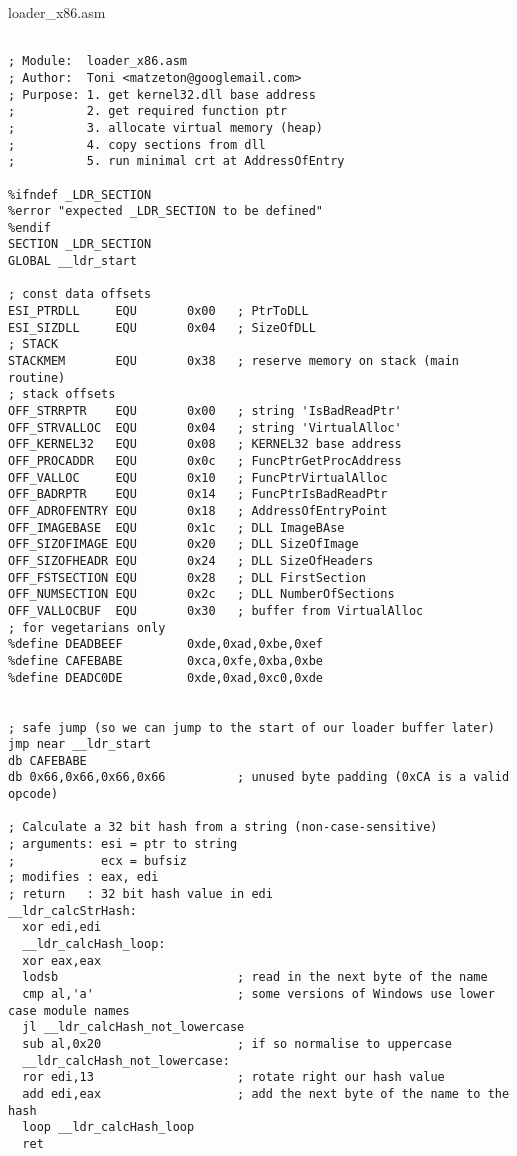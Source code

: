 \documentclass{article}
\begin{document}
\newpage
loader\_x86.asm
\begin{lstlisting}[frame=single]  % Start your code-block

; Module:  loader_x86.asm
; Author:  Toni <matzeton@googlemail.com>
; Purpose: 1. get kernel32.dll base address
;          2. get required function ptr
;          3. allocate virtual memory (heap)
;          4. copy sections from dll
;          5. run minimal crt at AddressOfEntry

%ifndef _LDR_SECTION
%error "expected _LDR_SECTION to be defined"
%endif
SECTION _LDR_SECTION
GLOBAL __ldr_start

; const data offsets
ESI_PTRDLL     EQU       0x00   ; PtrToDLL
ESI_SIZDLL     EQU       0x04   ; SizeOfDLL
; STACK
STACKMEM       EQU       0x38   ; reserve memory on stack (main routine)
; stack offsets
OFF_STRRPTR    EQU       0x00   ; string 'IsBadReadPtr'
OFF_STRVALLOC  EQU       0x04   ; string 'VirtualAlloc'
OFF_KERNEL32   EQU       0x08   ; KERNEL32 base address
OFF_PROCADDR   EQU       0x0c   ; FuncPtrGetProcAddress
OFF_VALLOC     EQU       0x10   ; FuncPtrVirtualAlloc
OFF_BADRPTR    EQU       0x14   ; FuncPtrIsBadReadPtr
OFF_ADROFENTRY EQU       0x18   ; AddressOfEntryPoint
OFF_IMAGEBASE  EQU       0x1c   ; DLL ImageBAse
OFF_SIZOFIMAGE EQU       0x20   ; DLL SizeOfImage
OFF_SIZOFHEADR EQU       0x24   ; DLL SizeOfHeaders
OFF_FSTSECTION EQU       0x28   ; DLL FirstSection
OFF_NUMSECTION EQU       0x2c   ; DLL NumberOfSections
OFF_VALLOCBUF  EQU       0x30   ; buffer from VirtualAlloc
; for vegetarians only
%define DEADBEEF         0xde,0xad,0xbe,0xef
%define CAFEBABE         0xca,0xfe,0xba,0xbe
%define DEADC0DE         0xde,0xad,0xc0,0xde


; safe jump (so we can jump to the start of our loader buffer later)
jmp near __ldr_start
db CAFEBABE
db 0x66,0x66,0x66,0x66          ; unused byte padding (0xCA is a valid opcode)

; Calculate a 32 bit hash from a string (non-case-sensitive)
; arguments: esi = ptr to string
;            ecx = bufsiz
; modifies : eax, edi
; return   : 32 bit hash value in edi
__ldr_calcStrHash:
  xor edi,edi
  __ldr_calcHash_loop:
  xor eax,eax
  lodsb                         ; read in the next byte of the name
  cmp al,'a'                    ; some versions of Windows use lower case module names
  jl __ldr_calcHash_not_lowercase
  sub al,0x20                   ; if so normalise to uppercase
  __ldr_calcHash_not_lowercase:
  ror edi,13                    ; rotate right our hash value
  add edi,eax                   ; add the next byte of the name to the hash
  loop __ldr_calcHash_loop
  ret



\end{lstlisting}
\end{document}
